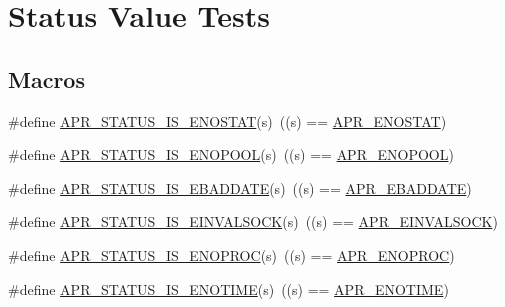 \hypertarget{group___a_p_r___s_t_a_t_u_s___i_s}{\section{Status Value Tests}
\label{group___a_p_r___s_t_a_t_u_s___i_s}
}
\subsection*{Macros}
\begin{DoxyCompactItemize}
\item 
\#define \hyperlink{group___a_p_r___s_t_a_t_u_s___i_s_ga1f0d21900aa879ca4866b1bf846cfd0d}{A\-P\-R\-\_\-\-S\-T\-A\-T\-U\-S\-\_\-\-I\-S\-\_\-\-E\-N\-O\-S\-T\-A\-T}(s)~((s) == \hyperlink{group___a_p_r___error_ga7995805cf68be1fb16f684c544e45fbe}{A\-P\-R\-\_\-\-E\-N\-O\-S\-T\-A\-T})
\item 
\#define \hyperlink{group___a_p_r___s_t_a_t_u_s___i_s_ga71f149437af305f0a0cabde2cc3f3b19}{A\-P\-R\-\_\-\-S\-T\-A\-T\-U\-S\-\_\-\-I\-S\-\_\-\-E\-N\-O\-P\-O\-O\-L}(s)~((s) == \hyperlink{group___a_p_r___error_gaa8461873202e5e0b4c0ea261e05b07a9}{A\-P\-R\-\_\-\-E\-N\-O\-P\-O\-O\-L})
\item 
\#define \hyperlink{group___a_p_r___s_t_a_t_u_s___i_s_gaf1313bed3538d6d57995bca164ebac20}{A\-P\-R\-\_\-\-S\-T\-A\-T\-U\-S\-\_\-\-I\-S\-\_\-\-E\-B\-A\-D\-D\-A\-T\-E}(s)~((s) == \hyperlink{group___a_p_r___error_ga7911720c540a929cc08a2c25e606b56e}{A\-P\-R\-\_\-\-E\-B\-A\-D\-D\-A\-T\-E})
\item 
\#define \hyperlink{group___a_p_r___s_t_a_t_u_s___i_s_ga7fcc752663660de85fa046b2de014b97}{A\-P\-R\-\_\-\-S\-T\-A\-T\-U\-S\-\_\-\-I\-S\-\_\-\-E\-I\-N\-V\-A\-L\-S\-O\-C\-K}(s)~((s) == \hyperlink{group___a_p_r___error_ga548032b79ce0671d9986db0654858812}{A\-P\-R\-\_\-\-E\-I\-N\-V\-A\-L\-S\-O\-C\-K})
\item 
\#define \hyperlink{group___a_p_r___s_t_a_t_u_s___i_s_ga566f4c9b9db8a0c31199a938bdc4e38a}{A\-P\-R\-\_\-\-S\-T\-A\-T\-U\-S\-\_\-\-I\-S\-\_\-\-E\-N\-O\-P\-R\-O\-C}(s)~((s) == \hyperlink{group___a_p_r___error_ga18aa6d4ebaefda39478649c20bbeb9df}{A\-P\-R\-\_\-\-E\-N\-O\-P\-R\-O\-C})
\item 
\#define \hyperlink{group___a_p_r___s_t_a_t_u_s___i_s_ga65cb54d0b5902784037626841e26e709}{A\-P\-R\-\_\-\-S\-T\-A\-T\-U\-S\-\_\-\-I\-S\-\_\-\-E\-N\-O\-T\-I\-M\-E}(s)~((s) == \hyperlink{group___a_p_r___error_ga7acfb436774a21ae93ff5c1b89e7c4f5}{A\-P\-R\-\_\-\-E\-N\-O\-T\-I\-M\-E})
\item 

\end{DoxyCompactItemize}
